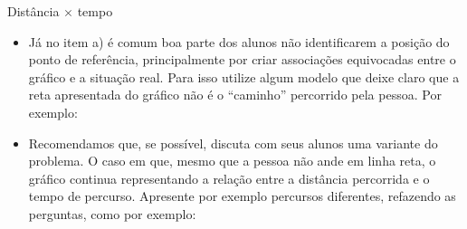 \begin{sugestions}{Distância $\times$ tempo}
{
\begin{itemize}
\item Já no item a) é comum boa parte dos alunos não identificarem a posição do ponto de referência, principalmente por criar associações equivocadas entre o gráfico e a situação real. Para isso utilize algum modelo que deixe claro que a reta apresentada do gráfico não é o “caminho” percorrido pela pessoa. Por exemplo:

\begin{figure}[H]
\centering

\end{figure}

\item Recomendamos que, se possível, discuta com seus alunos uma variante do problema. O caso em que, mesmo que a pessoa não ande em linha reta, o gráfico continua representando a relação entre a distância percorrida e o tempo de percurso. Apresente por exemplo percursos diferentes, refazendo as perguntas, como por exemplo:

\begin{figure}[H]
\centering
\usetikzlibrary{arrows.meta}




\end{figure}
\end{itemize}}
\end{sugestions}
